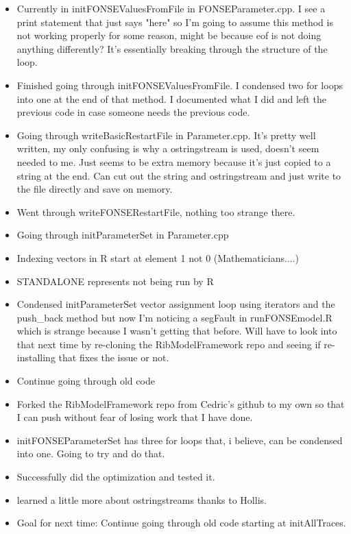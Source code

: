 \documentclass[letterpaper,index=totoc,hyperref,openany]{labbook} %
\begin{document}
\begin{itemize}
	\item Currently in initFONSEValuesFromFile in FONSEParameter.cpp. I see a print statement that just says "here" so I'm going to assume this method is not working properly for some reason, might be because eof is not doing anything differently? It's essentially breaking through the structure of the loop.
	\item Finished going through initFONSEValuesFromFile. I condensed two for loops into one at the end of that method. I documented what I did and left the previous code in case someone needs the previous code.
	\item Going through writeBasicRestartFile in Parameter.cpp. It's pretty well written, my only confusing is why a ostringstream is used, doesn't seem needed to me. Just seems to be extra memory because it's just copied to a string at the end. Can cut out the string and ostringstream and just write to the file directly and save on memory.
	\item Went through writeFONSERestartFile, nothing too strange there.
	\item Going through initParameterSet in Parameter.cpp
	\item Indexing vectors in R start at element 1 not 0 (Mathematicians....)
	\item STANDALONE represents not being run by R
	\item Condensed initParameterSet vector assignment loop using iterators and the push\_back method but now I'm noticing a segFault in runFONSEmodel.R which is strange because I wasn't getting that before. Will have to look into that next time by re-cloning the RibModelFramework repo and seeing if re-installing that fixes the issue or not.
\end{itemize}


\begin{itemize}
	\item Continue going through old code
\end{itemize}

\begin{itemize}
	\item Forked the RibModelFramework repo from Cedric's github to my own so that I can push without fear of losing work that I have done.
	\item initFONSEParameterSet has three for loops that, i believe, can be condensed into one. Going to try and do that.
	\item Successfully did the optimization and tested it.
	\item learned a little more about ostringstreams thanks to Hollis. 
	\item Goal for next time: Continue going through old code starting at initAllTraces.
\end{itemize}


\printbibliography
\end{document}
